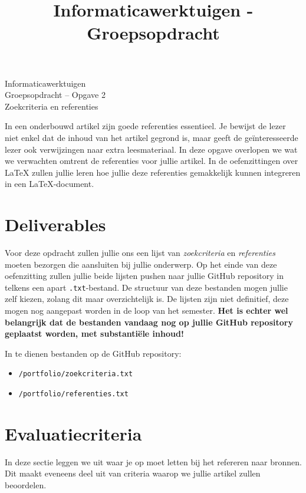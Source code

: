 \documentclass[a4paper]{article}
\title{Informaticawerktuigen - Groepsopdracht}
\begin{document}
\begin{center}
  \huge Informaticawerktuigen \\
  \Huge Groepsopdracht -- Opgave 2 \\
  \huge Zoekcriteria en referenties \\
\end{center}
\vspace{1em}


In een onderbouwd artikel zijn goede referenties essentieel.
Je bewijst de lezer niet enkel dat de inhoud van het artikel gegrond is, maar geeft de ge\"interesseerde lezer ook verwijzingen naar extra leesmateriaal.
In deze opgave overlopen we wat we verwachten omtrent de referenties voor jullie artikel.
In de oefenzittingen over \LaTeX{} zullen jullie leren hoe jullie deze referenties gemakkelijk kunnen integreren in een \LaTeX{}-document.


\section{Deliverables}

Voor deze opdracht zullen jullie ons een lijst van \textit{zoekcriteria} en \textit{referenties} moeten bezorgen die aansluiten bij jullie onderwerp.
Op het einde van deze oefenzitting zullen jullie beide lijsten pushen naar jullie GitHub repository in telkens een apart \texttt{.txt}-bestand.
De structuur van deze bestanden mogen jullie zelf kiezen, zolang dit maar overzichtelijk is.
De lijsten zijn niet definitief, deze mogen nog aangepast worden in de loop van het semester.
\textbf{Het is echter wel belangrijk dat de bestanden vandaag nog op jullie GitHub repository geplaatst worden, met substanti\"ele inhoud!}

In te dienen bestanden op de GitHub repository:

\begin{itemize}
	\item \texttt{/portfolio/zoekcriteria.txt}
	\item \texttt{/portfolio/referenties.txt}
\end{itemize}


\section{Evaluatiecriteria}

In deze sectie leggen we uit waar je op moet letten bij het refereren naar bronnen.
Dit maakt eveneens deel uit van criteria waarop we jullie artikel zullen beoordelen.
\end{document}

